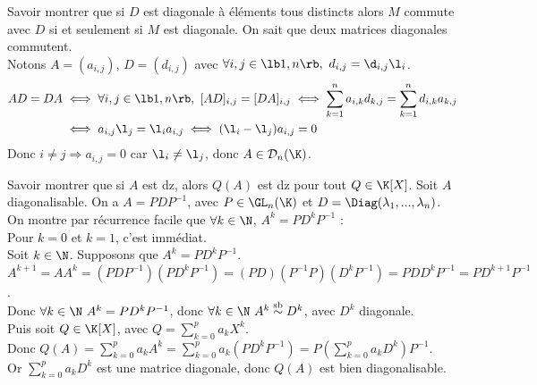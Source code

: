 \documentclass[french, 11pt]{article}
\begin{document}
\begin{exercice}{}{}
    Savoir montrer que si $D$ est diagonale à éléments tous distincts alors $M$ commute avec $D$ si et seulement si $M$ est diagonale.
    \tcblower
    \boxed{$\Leftarrow$} On sait que deux matrices diagonales commutent.\\
    \boxed{$\Rightarrow$} Notons $A=(a_{i,j})$, $D=(d_{i,j})$ avec $\forall i,j \in \lb1,n\rb, ~ d_{i,j}=\d_{i,j}\l_i$.
    \begin{align*}
        AD=DA &\iff \forall i,j \in \lb1,n\rb, ~ [AD]_{i,j} = [DA]_{i,j} \iff \sum_{k=1}^na_{i,k}d_{k,j} = \sum_{k=1}^n d_{i,k}a_{k,j}\\
        &\iff a_{i,j}\l_j = \l_i a_{i,j} \iff (\l_i - \l_j)a_{i,j} = 0
    \end{align*}
    Donc $i\neq j \Rightarrow a_{i,j}=0$ car $\l_i \neq \l_j$, donc $A\in\mathcal{D}_n(\K)$.
\end{exercice}

\begin{exercice}{}{}
    Savoir montrer que si $A$ est dz, alors $Q(A)$ est dz pour tout $Q \in \K[X]$.
    \tcblower
    Soit $A$ diagonalisable. On a $A = PDP^{-1}$, avec $P \in \GL_n(\K)$ et $D = \Diag(\lambda_1,...,\lambda_n)$.\\
    On montre par récurrence facile que $\forall k \in \N$, $A^k = PD^kP^{-1}$ : \\
    Pour $k = 0$ et $k = 1$, c'est immédiat.\\
    Soit $k \in \N$. Supposons que $A^k = PD^kP^{-1}$. $A^{k+1} = AA^k = (PDP^{-1})(PD^kP^{-1}) = (PD)(P^{-1}P)(D^kP^{-1}) = PDD^kP^{-1} = PD^{k+1}P^{-1}$.\\
    Donc $\forall k \in \N ~ A^k = PD^kP^{-1}$, donc $\forall k \in \N ~ A^k \overset{\text{sb}}{\sim} D^k$, avec $D^k$ diagonale.\\
    Puis soit $Q \in \K[X]$, avec $Q = \sum_{k = 0}^{p}a_kX^k$.\\
    Donc $Q(A) = \sum_{k = 0}^{p}a_kA^k = \sum_{k = 0}^{p}a_k(PD^kP^{-1}) = P(\sum_{k = 0}^{p}a_kD^k)P^{-1}$.\\
    Or $\sum_{k = 0}^{p}a_kD^k$ est une matrice diagonale, donc $Q(A)$ est bien diagonalisable.
\end{exercice}
\end{document}
